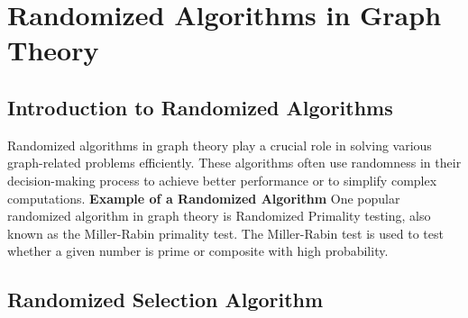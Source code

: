 \documentclass[12pt]{book} %
\begin{document}
\section{Randomized Algorithms in Graph Theory}
\subsection{Introduction to Randomized Algorithms}

Randomized algorithms in graph theory play a crucial role in solving various graph-related problems efficiently. These algorithms often use randomness in their decision-making process to achieve better performance or to simplify complex computations.
\FloatBarrier
\textbf{Example of a Randomized Algorithm}
One popular randomized algorithm in graph theory is Randomized Primality testing, also known as the Miller-Rabin primality test. The Miller-Rabin test is used to test whether a given number is prime or composite with high probability.
\subsection{Randomized Selection Algorithm}
\end{document}
